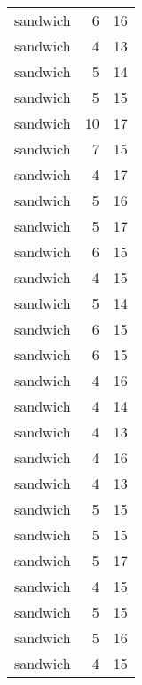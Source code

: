 \begin{table}
\begin{tabular}{lrr}
                        sandwich &         6 &        16 \\
                        sandwich &         4 &        13 \\
                        sandwich &         5 &        14 \\
                        sandwich &         5 &        15 \\
                        sandwich &        10 &        17 \\
                        sandwich &         7 &        15 \\
                        sandwich &         4 &        17 \\
                        sandwich &         5 &        16 \\
                        sandwich &         5 &        17 \\
                        sandwich &         6 &        15 \\
                        sandwich &         4 &        15 \\
                        sandwich &         5 &        14 \\
                        sandwich &         6 &        15 \\
                        sandwich &         6 &        15 \\
                        sandwich &         4 &        16 \\
                        sandwich &         4 &        14 \\
                        sandwich &         4 &        13 \\
                        sandwich &         4 &        16 \\
                        sandwich &         4 &        13 \\
                        sandwich &         5 &        15 \\
                        sandwich &         5 &        15 \\
                        sandwich &         5 &        17 \\
                        sandwich &         4 &        15 \\
                        sandwich &         5 &        15 \\
                        sandwich &         5 &        16 \\
                        sandwich &         4 &        15 \\

\end{tabular}
\end{table}
